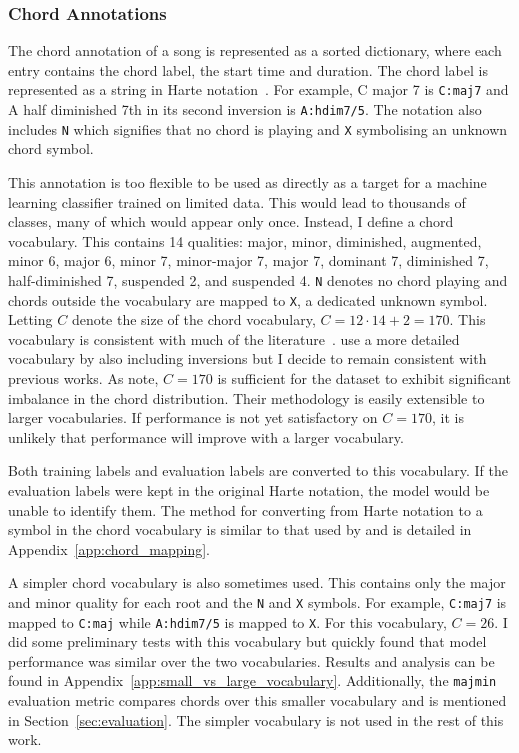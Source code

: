 \subsubsection{Chord Annotations}\label{sec:chord-annotations}

The chord annotation of a song is represented as a sorted dictionary, where each entry contains the chord label, the start time and duration. The chord label is represented as a string in Harte notation~\citep{HarteNotation}. For example, C major 7 is \texttt{C:maj7} and A half diminished 7th in its second inversion is \texttt{A:hdim7/5}. The notation also includes \texttt{N} which signifies that no chord is playing and \texttt{X} symbolising an unknown chord symbol.

This annotation is too flexible to be used as directly as a target for a machine learning classifier trained on limited data. This would lead to thousands of classes, many of which would appear only once. Instead, I define a chord vocabulary. This contains 14 qualities: major, minor, diminished, augmented, minor 6, major 6, minor 7, minor-major 7, major 7, dominant 7, diminished 7, half-diminished 7, suspended 2, and suspended 4. \texttt{N} denotes no chord playing and chords outside the vocabulary are mapped to \texttt{X}, a dedicated unknown symbol. Letting $C$ denote the size of the chord vocabulary, $C=12\cdot14 + 2 = 170$. This vocabulary is consistent with much of the literature~\citep{StructuredTraining,FourTimelyInsights,ACRLargeVocab1}. \citet{ACRLargeVocab1} use a more detailed vocabulary by also including inversions but I decide to remain consistent with previous works. As \citet{StructuredTraining} note, $C=170$ is sufficient for the dataset to exhibit significant imbalance in the chord distribution. Their methodology is easily extensible to larger vocabularies. If performance is not yet satisfactory on $C=170$, it is unlikely that performance will improve with a larger vocabulary.

Both training labels and evaluation labels are converted to this vocabulary. If the evaluation labels were kept in the original Harte notation, the model would be unable to identify them. The method for converting from Harte notation to a symbol in the chord vocabulary is similar to that used by \citet{StructuredTraining} and is detailed in Appendix~\ref{app:chord_mapping}.

A simpler chord vocabulary is also sometimes used. This contains only the major and minor quality for each root and the \texttt{N} and \texttt{X} symbols. For example, \texttt{C:maj7} is mapped to \texttt{C:maj} while \texttt{A:hdim7/5} is mapped to \texttt{X}. For this vocabulary, $C=26$. I did some preliminary tests with this vocabulary but quickly found that model performance was similar over the two vocabularies. Results and analysis can be found in Appendix~\ref{app:small_vs_large_vocabulary}. Additionally, the \texttt{majmin} evaluation metric compares chords over this smaller vocabulary and is mentioned in Section~\ref{sec:evaluation}. The simpler vocabulary is not used in the rest of this work.

